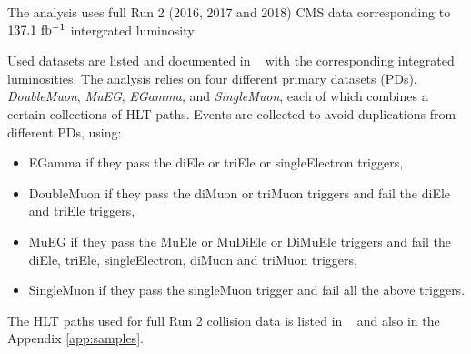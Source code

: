 

\label{sec:trigpaths}
%
The analysis uses full Run 2 (2016, 2017 and 2018) CMS data corresponding to $137.1~\mathrm{fb^{-1}}$ intergrated luminosity.  

Used datasets are listed and documented in ~\cite{CMS:2019chr} with the corresponding integrated luminosities. %
The analysis relies on four different primary datasets (PDs), {\it DoubleMuon}, {\it MuEG}, {\it EGamma}, and {\it SingleMuon},
each of which combines a certain collections of HLT paths. 
Events are collected to avoid duplications from different PDs, using: 
\begin{itemize}
\item EGamma if they pass the diEle or triEle or singleElectron triggers,
\item DoubleMuon if they pass the diMuon or triMuon triggers and fail the diEle and triEle triggers,
\item MuEG if they pass the MuEle or MuDiEle or DiMuEle triggers and fail the diEle, triEle, singleElectron, diMuon and triMuon triggers,
\item SingleMuon if they pass the singleMuon trigger and fail all the above triggers. 
\end{itemize} 

The HLT paths used for full Run 2 collision data is listed in ~\cite{CMS:2019chr} and also in the Appendix \ref{app:samples}. %


